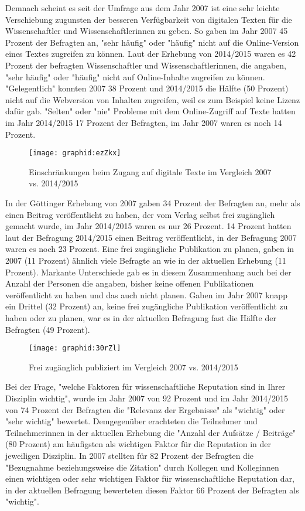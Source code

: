 Demnach scheint es seit der Umfrage aus dem Jahr 2007 ist eine sehr leichte Verschiebung zu­guns­ten der besseren Verfügbarkeit von digitalen Texten für die Wissenschaftler und Wissenschaftlerinnen zu geben. So gaben im Jahr 2007 45 Prozent der Befragten an, "sehr häufig" oder "häufig" nicht auf die Online-Version eines Textes zugreifen zu können. Laut der Erhebung von 2014/2015 waren es 42 Prozent der befragten Wissenschaftler und Wissenschaftlerinnen, die angaben, "sehr häufig" oder "häufig" nicht auf Online-Inhalte zugreifen zu können. "Gelegentlich" konnten 2007 38 Prozent und 2014/2015 die Hälfte (50 Prozent) nicht auf die Webversion von Inhalten zugreifen, weil es zum Beispiel keine Lizenz dafür gab. "Selten" oder "nie" Probleme mit dem Online-Zugriff auf Texte hatten im Jahr 2014/2015 17 Prozent der Befragten, im Jahr 2007 waren es noch 14 Prozent.

\begin{figure}[h!]
\texttt{[image: graphid:ezZkx]}
\caption{Einschränkungen beim Zugang auf digitale Texte im Vergleich 2007 vs. 2014/2015}
\end{figure}

In der Göttinger Erhebung von 2007 gaben 34 Prozent der Befragten an, mehr als einen Beitrag veröffentlicht zu haben, der vom Verlag selbst frei zugänglich gemacht wurde, im Jahr 2014/2015 waren es nur 26 Prozent. 14 Prozent hatten laut der Befragung 2014/2015 einen Beitrag veröffentlicht, in der Befragung 2007 waren es noch 23 Prozent. Eine frei zugängliche Publikation zu planen, gaben in 2007 (11 Prozent) ähnlich viele Befragte an wie in der aktuellen Erhebung (11 Prozent). Markante Unterschiede gab es in diesem Zusammenhang auch bei der Anzahl der Personen die angaben, bisher keine offenen Publikationen veröffentlicht zu haben und das auch nicht planen. Gaben im Jahr 2007 knapp ein Drittel (32 Prozent) an, keine frei zugängliche Publikation veröffentlicht zu haben oder zu planen, war es in der aktuellen Befragung fast die Hälfte der Befragten (49 Prozent).

\begin{figure}[h!]
\texttt{[image: graphid:30rZl]}
\caption{Frei zugänglich publiziert im Vergleich 2007 vs. 2014/2015}
\end{figure}

Bei der Frage, "welche Faktoren für wissenschaftliche Reputation sind in Ihrer Disziplin wichtig", wurde im Jahr 2007 von 92 Prozent und im Jahr 2014/2015 von 74 Prozent der Befragten die "Relevanz der Ergebnisse" als "wichtig" oder "sehr wichtig" bewertet. Demgegenüber erachteten die Teilnehmer und Teilnehmerinnen in der aktuellen Erhebung die "Anzahl der Aufsätze / Beiträge" (80 Prozent) am häufigsten als wichtigen Faktor für die Reputation in der jeweiligen Disziplin. In 2007 stellten für 82 Prozent der Befragten die "Bezugnahme beziehungsweise die Zitation" durch Kollegen und Kolleginnen einen wichtigen oder sehr wichtigen Faktor für wissenschaftliche Reputation dar, in der aktuellen Befragung bewerteten diesen Faktor 66 Prozent der Befragten als "wichtig".

